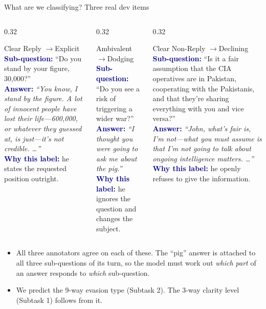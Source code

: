 \documentclass[aspectratio=169,10pt]{beamer}
\newcommand{\excard}[4]{%
  \begin{block}{#1}\small
    \textcolor{navy}{\textbf{Sub-question:}} #2\\[3pt]
    \textcolor{navy}{\textbf{Answer:}} \emph{#3}\\[3pt]
    \textcolor{navy}{\textbf{Why this label:}} #4
  \end{block}}
\begin{document}
\begin{frame}{What are we classifying? Three real dev items}
  \begin{columns}[T]
    \begin{column}{0.32\textwidth}
      \excard{Clear Reply \quad$\rightarrow$\quad Explicit}
        {``Do you stand by your figure, 30,000?''}
        {``You know, I stand by the figure. A lot of innocent people have lost their life---600,000, or whatever they guessed at, is just---it's not credible. \ldots''}
        {he states the requested position outright.}
    \end{column}
    \begin{column}{0.32\textwidth}
      \excard{Ambivalent \quad$\rightarrow$\quad Dodging}
        {``Do you see a risk of triggering a wider war?''}
        {``I thought you were going to ask me about the pig.''}
        {he ignores the question and changes the subject.}
    \end{column}
    \begin{column}{0.32\textwidth}
      \excard{Clear Non-Reply \quad$\rightarrow$\quad Declining}
        {``Is it a fair assumption that the CIA operatives are in Pakistan, cooperating with the Pakistanis, and that they're sharing everything with you and vice versa?''}
        {``John, what's fair is, I'm not---what you must assume is that I'm not going to talk about ongoing intelligence matters. \ldots''}
        {he openly refuses to give the information.}
    \end{column}
  \end{columns}
  \vspace{6pt}
  \begin{itemize}\small
    \item All three annotators agree on each of these. The ``pig'' answer is attached to all three sub-questions of its turn, so the model must work out \emph{which part} of an answer responds to \emph{which} sub-question.
    \item We predict the 9-way evasion type (Subtask 2). The 3-way clarity level (Subtask 1) follows from it.
  \end{itemize}
\end{frame}
\end{document}
